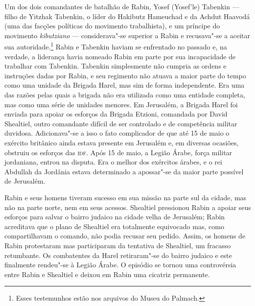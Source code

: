Um dos dois comandantes de batalhão de Rabin, Yosef (Yosef'le) Tabenkin
--- filho de Yitzhak Tabenkin, o líder do Hakibutz Hameuchad e da Achdut
Haavodá (uma das facções políticas do movimento trabalhista), e um
príncipe do movimento \emph{kibutziano} --- considerava"-se superior a Rabin e
recusava"-se a aceitar sua autoridade.\footnote{Esses testemunhos estão nos arquivos do Museu do Palmach.} Rabin e Tabenkin haviam
se enfrentado no passado e, na verdade, a liderança havia nomeado Rabin
em parte por sua incapacidade de trabalhar com Tabenkin. Tabenkin
simplesmente não cumpria as ordens e instruções dadas por Rabin, e seu
regimento não atuava a maior parte do tempo como uma unidade da Brigada
Harel, mas sim de forma independente. Era uma das razões pelas quais a
brigada não era utilizada como uma entidade completa, mas como uma série
de unidades menores. Em Jerusalém, a Brigada Harel foi enviada para
apoiar os esforços da Brigada Etzioni, comandada por David Shealtiel,
outro comandante difícil de ser controlado e de competência militar
duvidosa. Adicionava"-se a isso o fato complicador de que até 15 de maio o
exército britânico ainda estava presente em Jerusalém e, em diversas
ocasiões, obstruiu os esforços das \textsc{idf}. Após 15 de maio, a Legião Árabe,
força militar jordaniana, entrou na disputa. Era o melhor dos exércitos
árabes, e o rei Abdullah da Jordânia estava determinado a apossar"-se da
maior parte possível de Jerusalém.

Rabin e seus homens tiveram sucesso em sua missão na parte sul da
cidade, mas não na parte norte, nem em seus acessos. Shealtiel
pressionou Rabin a apoiar seus esforços para salvar o bairro judaico na
cidade velha de Jerusalém; Rabin acreditava que o plano de Shealtiel era
totalmente equivocado mas, como compartilhavam o comando, não podia
recusar seu pedido. Assim, os homens de Rabin protestaram mas
participaram da tentativa de Shealtiel, um fracasso retumbante. Os
combatentes da Harel retiraram"-se do bairro judaico e este finalmente
rendeu"-se à Legião Árabe. O episódio se tornou uma
controvérsia entre Rabin e Shealtiel e deixou em Rabin uma cicatriz
permanente.

